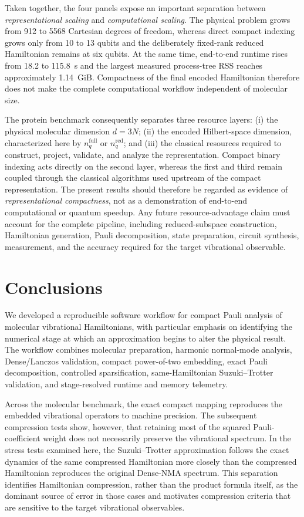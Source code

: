 \documentclass[aip,jcp,reprint,amsmath,amssymb,floatfix]{revtex4-2}
\begin{document}
Taken together, the four panels expose an important separation between
\emph{representational scaling} and \emph{computational scaling}. The physical
problem grows from 912 to 5568 Cartesian degrees of freedom, whereas direct
compact indexing grows only from 10 to 13 qubits and the deliberately
fixed-rank reduced Hamiltonian remains at six qubits. At the same time,
end-to-end runtime rises from 18.2 to 115.8~s and the largest measured
process-tree RSS reaches approximately 1.14~GiB. Compactness of the final
encoded Hamiltonian therefore does not make the complete computational
workflow independent of molecular size.

The protein benchmark consequently separates three resource layers:
(i) the physical molecular dimension $d=3N$;
(ii) the encoded Hilbert-space dimension, characterized here by
$n_q^{\mathrm{full}}$ or $n_q^{\mathrm{red}}$; and
(iii) the classical resources required to construct, project, validate, and
analyze the representation. Compact binary indexing acts directly on the
second layer, whereas the first and third remain coupled through the
classical algorithms used upstream of the compact representation. The present
results should therefore be regarded as evidence of \emph{representational
compactness}, not as a demonstration of end-to-end computational or quantum
speedup. Any future resource-advantage claim must account for the complete
pipeline, including reduced-subspace construction, Hamiltonian generation,
Pauli decomposition, state preparation, circuit synthesis, measurement, and
the accuracy required for the target vibrational observable.

\section{Conclusions}
We developed a reproducible software workflow for compact Pauli analysis of
molecular vibrational Hamiltonians, with particular emphasis on identifying
the numerical stage at which an approximation begins to alter the physical
result. The workflow combines molecular preparation, harmonic normal-mode
analysis, Dense/Lanczos validation, compact power-of-two embedding, exact
Pauli decomposition, controlled sparsification, same-Hamiltonian
Suzuki--Trotter validation, and stage-resolved runtime and memory telemetry.

Across the molecular benchmark, the exact compact mapping reproduces the
embedded vibrational operators to machine precision. The subsequent
compression tests show, however, that retaining most of the squared
Pauli-coefficient weight does not necessarily preserve the vibrational
spectrum. In the stress tests examined here, the Suzuki--Trotter
approximation follows the exact dynamics of the same compressed Hamiltonian
more closely than the compressed Hamiltonian reproduces the original
Dense-NMA spectrum. This separation identifies Hamiltonian compression,
rather than the product formula itself, as the dominant source of error in
those cases and motivates compression criteria that are sensitive to the
target vibrational observables.
\end{document}

